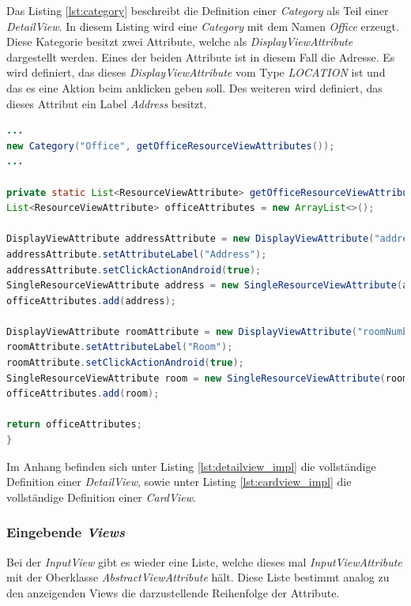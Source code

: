 Das Listing \ref{lst:category} beschreibt die Definition einer \textit{Category} als Teil einer \textit{DetailView}. In diesem Listing wird eine \textit{Category} mit dem Namen \textit{Office} erzeugt. Diese Kategorie besitzt zwei Attribute, welche als \textit{DisplayViewAttribute} dargestellt werden. Eines der beiden Attribute ist in diesem Fall die Adresse. Es wird definiert, das dieses \textit{DisplayViewAttribute} vom Type \textit{LOCATION} ist und das es eine Aktion beim anklicken geben soll. Des weiteren wird definiert, das dieses Attribut ein Label \textit{Address} besitzt.

\begin{lstlisting}[label=lst:category,
language=java,
firstnumber=1,
caption=Erstellung einer \textit{Category}.]		
...
new Category("Office", getOfficeResourceViewAttributes());
...

private static List<ResourceViewAttribute> getOfficeResourceViewAttributes() {
List<ResourceViewAttribute> officeAttributes = new ArrayList<>();

DisplayViewAttribute addressAttribute = new DisplayViewAttribute("address", ViewAttribute.AttributeType.LOCATION);
addressAttribute.setAttributeLabel("Address");
addressAttribute.setClickActionAndroid(true);
SingleResourceViewAttribute address = new SingleResourceViewAttribute(addressAttribute);
officeAttributes.add(address);

DisplayViewAttribute roomAttribute = new DisplayViewAttribute("roomNumber", ViewAttribute.AttributeType.TEXT);
roomAttribute.setAttributeLabel("Room");
roomAttribute.setClickActionAndroid(true);
SingleResourceViewAttribute room = new SingleResourceViewAttribute(roomAttribute);
officeAttributes.add(room);

return officeAttributes;
}
\end{lstlisting}

Im Anhang befinden sich unter Listing \ref{lst:detailview_impl} die vollständige Definition einer \textit{DetailView}, sowie unter Listing \ref{lst:cardview_impl} die vollständige Definition einer \textit{CardView}. 

\subsubsection{Eingebende \textit{Views}}

Bei der \textit{InputView} gibt es wieder eine Liste, welche dieses mal \textit{InputViewAttribute} mit der Oberklasse \textit{AbstractViewAttribute} hält. Diese Liste bestimmt analog zu den anzeigenden Views die darzustellende Reihenfolge der Attribute. 


